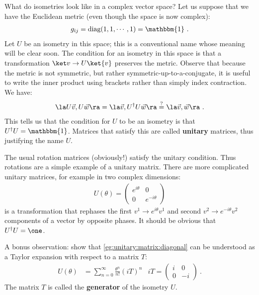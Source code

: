 \begin{example} What do isometries look like in a complex vector space? Let us suppose that we have the Euclidean metric (even though the space is now complex):
\begin{align}
    g_{\bar\imath j} = \text{diag}(1,1,\cdots, 1) = \mathbbm{1} \ .
\end{align}
Let $U$ be an isometry in this space; this is a conventional name whose meaning will be clear soon. The condition for an isometry in this space is that a transformation $\ket v \to U\ket{v}$ preserves the metric. Observe that because the metric is not symmetric, but rather symmetric-up-to-a-conjugate, it is useful to write the inner product using brackets rather than simply index contraction. We have:
\begin{align}
    \la U\vec{v}, U\vec{w} \ra = \la \vec{v}, U^\dag U \vec{w} \ra \stackrel{?}{=} \la \vec{v}, \vec{w} \ra \ .
\end{align}
This tells us that the condition for $U$ to be an isometry is that $U^\dag U = \mathbbm{1}$. Matrices that satisfy this are called \textbf{unitary} matrices, thus justifying the name $U$. 
\end{example}

\begin{example}
The usual rotation matrices (obviously!) satisfy the unitary condition. Thus rotations are a simple example of a unitary matrix. There are more complicated unitary matrices, for example in two complex dimensions:
\begin{align}
    U(\theta) = 
    \begin{pmatrix}
        e^{i\theta} & 0\\
        0 & e^{-i\theta}
    \end{pmatrix}
    \label{eg:unitary:matrix:diagonal}
\end{align}
is a transformation that rephases the first $v^1 \to e^{i\theta}v^1$  and second $v^2 \to e^{-i\theta}v^2$ components of a vector by opposite phases. It should be obvious that $U^\dag U = \one$. 
\end{example}


\begin{exercise}
A bonus observation: show that \eqref{eg:unitary:matrix:diagonal} can be understood as a Taylor expansion with respect to a matrix $T$:
\begin{align}
    U(\theta) &= \sum_{n=0}^\infty \frac{\theta^n}{n!} (iT)^n
    &
    iT=
    \begin{pmatrix}
        i & 0\\
        0 & -i
    \end{pmatrix} \ .
\end{align}
The matrix $T$ is called the \textbf{generator} of the isometry $U$. 
\end{exercise}



